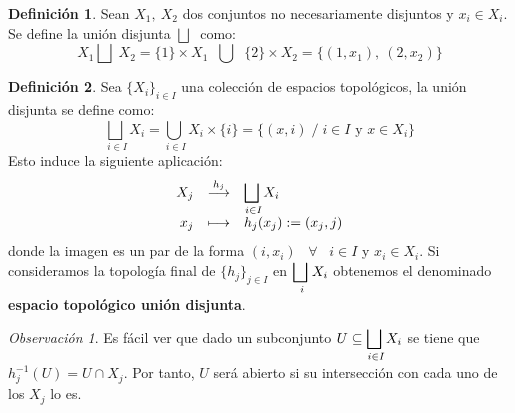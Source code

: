 \documentclass[12pt,twoside]{report}
\theoremstyle{azul}
\theoremstyle{azul2}
\theoremstyle{plain}
\theoremstyle{definition}
\newtheorem*{defi}{Definición}
\theoremstyle{remark}
\newtheorem*{obs}{Observación}
\begin{document}
\begin{defi}
Sean $X_1, \: X_2$ dos conjuntos no necesariamente disjuntos y $x_i \in X_i$. Se define la unión disjunta $\bigsqcup \;$ como:
$$X_1 \bigsqcup \;  X_2 = \{1\} \times X_1 \;\; \bigcup \;\; \{2\} \times X_2 = \{(1,x_1), \: (2, x_2)\}$$
\end{defi}

\begin{defi}
Sea $\{ X_i\}_{i \in I}$ una colección de espacios topológicos, la unión disjunta se define como:
$$\underset{i \in I}{\bigsqcup \;} X_i = \underset{i\in I}{\bigcup \;} X_i \times \{i\} = \{ (x,i) \; / \; i \in I \text{ y } x \in X_i \}$$\vspace{-3mm}
Esto induce la siguiente aplicación: 
\vspace{3mm} $$ \begin{array}{rcl}
     X_j & \stackrel{h_j}{\longrightarrow} & \underset{i\in I}{\mathlarger{\bigsqcup} \;} X_i  \\
     x_j & \longmapsto & h_j(x_j) : = (x_j, j) 
\end{array}$$
donde la imagen es un par de la forma $(i, x_i) \; \; \; \forall \; \; \; i \in I$ y $x_i \in X_i$. Si consideramos la topología  final de $\{ h_j \}_{j \in I}$ en $\underset{i}{\mathlarger{\bigsqcup} \;} X_i$ obtenemos el denominado \textbf{espacio topológico unión disjunta}. 
\end{defi}
\begin{obs}
Es fácil ver que dado un subconjunto $U \subseteq \underset{i\in I}{\mathlarger{\bigsqcup} \;} X_i$ se tiene que $ h_j^{-1}(U)=U \cap X_j$. Por tanto, $U$ será abierto si su intersección con cada uno de los $X_j$ lo es.
\end{obs}
\end{document}
